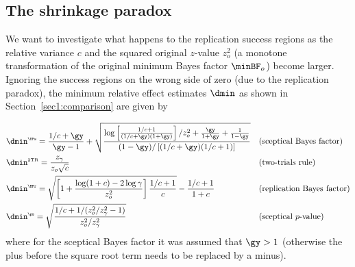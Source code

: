 \begin{subappendices}
\section{The shrinkage paradox}
\label{app:shrinkage}
We want to investigate what happens to the replication success regions as the
relative variance $c$ and the squared original $z$-value $z_{o}^{2}$ (a monotone
transformation of the original minimum Bayes factor $\minBF_{o}$) become larger.
Ignoring the success regions on the wrong side of zero (due to the replication
paradox), the minimum relative effect estimates $\dmin$ as shown in
Section~\ref{sec1:comparison} are given by

\begin{align*}
    &\dmin^{\scriptscriptstyle \BFs} =
      \frac{1/c + \gy}{\gy - 1} +
      \sqrt{\frac{\log\left[\frac{1/c + 1}{(1/c + \gy)(1 + \gy)}\right]/z_{o}^{2}
      + \frac{\gy}{1 + \gy} + \frac{1}{1 - \gy}}{(1 - \gy)/\left[(1/c + \gy)(1/c + 1)\right]}}&
  &\text{(sceptical Bayes factor)} \\
    &\dmin^{\scriptscriptstyle \text{2TR}} =
      \frac{z_{\gamma}}{z_{o}\sqrt{c}}&
  &\text{(two-trials rule)} \\
    &\dmin^{\scriptscriptstyle \BFr} =
      \sqrt{\left[1 + \frac{\log(1 + c) - 2\log \gamma}{z_{o}^{2}}\right] \frac{1/c + 1}{c}} - \frac{1/c + 1}{1 + c} &
  &\text{(replication Bayes factor)} \\
    &\dmin^{\scriptscriptstyle \ps} =
      \sqrt{\frac{1/c + 1/(z_{o}^{2}/z_{\gamma}^{2} - 1)}{z_{o}^{2}/z_{\gamma}^{2}}}&
  &\text{(sceptical $p$-value)} \\
\end{align*}
where for the sceptical Bayes factor it was assumed that $\gy > 1$ (otherwise
the plus before the square root term needs to be replaced by a minus).


\end{subappendices}
